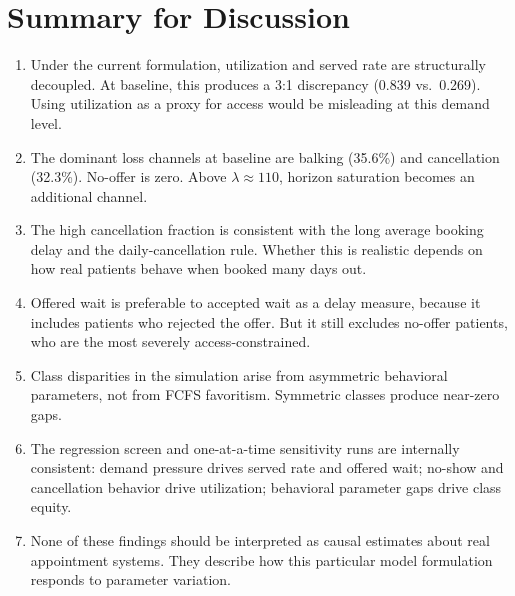 \documentclass[11pt]{article}
\begin{document}
\section{Summary for Discussion}
\label{sec:summary}

\begin{enumerate}[leftmargin=1.5em, itemsep=4pt]
\item Under the current formulation, utilization and served rate are
structurally decoupled. At baseline, this produces a 3:1 discrepancy
(0.839 vs.\ 0.269). Using utilization as a proxy for access would be
misleading at this demand level.

\item The dominant loss channels at baseline are balking (35.6\%) and
cancellation (32.3\%). No-offer is zero. Above $\lambda \approx 110$,
horizon saturation becomes an additional channel.

\item The high cancellation fraction is consistent with the long average
booking delay and the daily-cancellation rule. Whether this is realistic
depends on how real patients behave when booked many days out.

\item Offered wait is preferable to accepted wait as a delay measure,
because it includes patients who rejected the offer. But it still excludes
no-offer patients, who are the most severely access-constrained.

\item Class disparities in the simulation arise from asymmetric behavioral
parameters, not from FCFS favoritism. Symmetric classes produce
near-zero gaps.

\item The regression screen and one-at-a-time sensitivity runs are
internally consistent: demand pressure drives served rate and offered
wait; no-show and cancellation behavior drive utilization; behavioral
parameter gaps drive class equity.

\item None of these findings should be interpreted as causal estimates
about real appointment systems. They describe how this particular model
formulation responds to parameter variation.
\end{enumerate}
\end{document}
